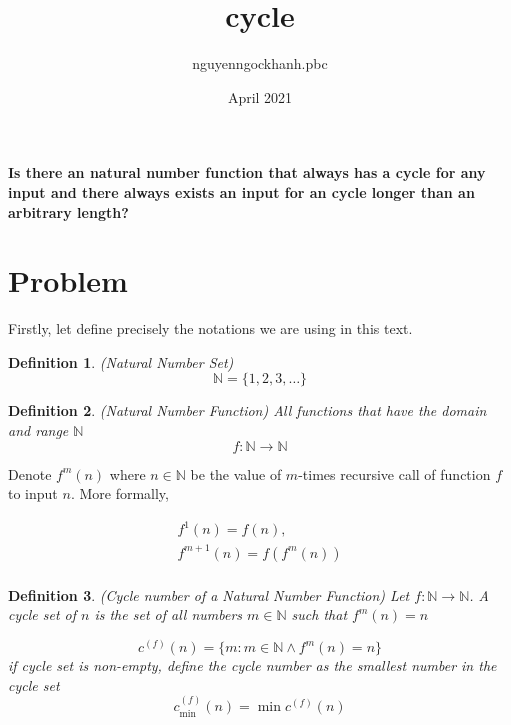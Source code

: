 \documentclass{article}
\title{cycle}
\author{nguyenngockhanh.pbc }
\date{April 2021}
\newtheorem{definition}{Definition}
\begin{document}
    \maketitle

    \textbf{Is there an natural number function that always has a cycle for any input and there always exists an input for an cycle longer than an arbitrary length?}


    \section{Problem}\label{sec:problem}

    Firstly, let define precisely the notations we are using in this text.

    \begin{definition}(Natural Number Set)
        \begin{equation}
            \label{eq:natural}
            \mathbb{N} = \{ 1, 2, 3, \dots \}
        \end{equation}
    \end{definition}

    \begin{definition}(Natural Number Function)
        All functions that have the domain and range $\mathbb{N}$
        \begin{equation}
            \label{eq:function}
            f: \mathbb{N} \to \mathbb{N}
        \end{equation}
    \end{definition}

    Denote $f^m(n)$ where $n \in \mathbb{N}$ be the value of $m$-times recursive call of function $f$ to input $n$.
    More formally,

    \begin{gather*}
        f^1(n) = f(n),\\
        f^{m+1}(n) = f(f^m(n))\\
    \end{gather*}


    \begin{definition}(Cycle number of a Natural Number Function)
        Let $f: \mathbb{N} \to \mathbb{N}$.
        A cycle set of $n$ is the set of all numbers $m \in \mathbb{N}$ such that $f^m(n) = n$

        \begin{equation}
            \label{eq:cycle_set}
            c^{(f)}(n) = \{m : m \in \mathbb{N} \land f^m(n) = n \}
        \end{equation}
        if cycle set is non-empty, define the cycle number as the smallest number in the cycle set
        \begin{equation}
            \label{eq:cycle_number}
            c^{(f)}_{\min}(n) = \min{c^{(f)}(n)}
        \end{equation}
    \end{definition}
\end{document}
